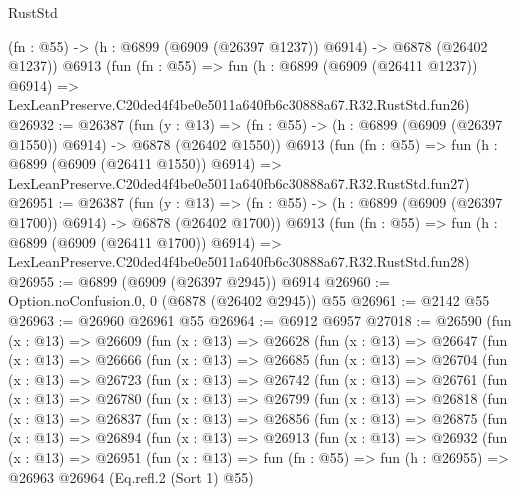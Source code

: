 \begin{lexlean}{RustStd}
\begin{coremodule}
    (fn : @55) -> (h : @6899 (@6909 (@26397 @1237)) @6914) -> @6878 (@26402 @1237))
    @6913
    (fun (fn : @55) =>
    fun (h : @6899 (@6909 (@26411 @1237)) @6914) =>
    LexLeanPreserve.C20ded4f4be0e5011a640fb6c30888a67.R32.RustStd.fun26)
@26932 := @26387
    (fun (y : @13) =>
    (fn : @55) -> (h : @6899 (@6909 (@26397 @1550)) @6914) -> @6878 (@26402 @1550))
    @6913
    (fun (fn : @55) =>
    fun (h : @6899 (@6909 (@26411 @1550)) @6914) =>
    LexLeanPreserve.C20ded4f4be0e5011a640fb6c30888a67.R32.RustStd.fun27)
@26951 := @26387
    (fun (y : @13) =>
    (fn : @55) -> (h : @6899 (@6909 (@26397 @1700)) @6914) -> @6878 (@26402 @1700))
    @6913
    (fun (fn : @55) =>
    fun (h : @6899 (@6909 (@26411 @1700)) @6914) =>
    LexLeanPreserve.C20ded4f4be0e5011a640fb6c30888a67.R32.RustStd.fun28)
@26955 := @6899 (@6909 (@26397 @2945)) @6914
@26960 := Option.noConfusion.{0, 0} (@6878 (@26402 @2945)) @55
@26961 := @2142 @55
@26963 := @26960 @26961 @55
@26964 := @6912 @6957
@27018 := @26590
    (fun (x : @13) =>
    @26609
      (fun (x : @13) =>
      @26628
        (fun (x : @13) =>
        @26647
          (fun (x : @13) =>
          @26666
            (fun (x : @13) =>
            @26685
              (fun (x : @13) =>
              @26704
                (fun (x : @13) =>
                @26723
                  (fun (x : @13) =>
                  @26742
                    (fun (x : @13) =>
                    @26761
                      (fun (x : @13) =>
                      @26780
                        (fun (x : @13) =>
                        @26799
                          (fun (x : @13) =>
                          @26818
                            (fun (x : @13) =>
                            @26837
                              (fun (x : @13) =>
                              @26856
                                (fun (x : @13) =>
                                @26875
                                  (fun (x : @13) =>
                                  @26894
                                    (fun (x : @13) =>
                                    @26913
                                      (fun (x : @13) =>
                                      @26932
                                        (fun (x : @13) =>
                                        @26951
                                          (fun (x : @13) =>
                                          fun (fn : @55) =>
                                          fun (h : @26955) =>
                                          @26963
                                            @26964
                                            (Eq.refl.{2} (Sort 1) @55)

\end{coremodule}
\end{lexlean}
